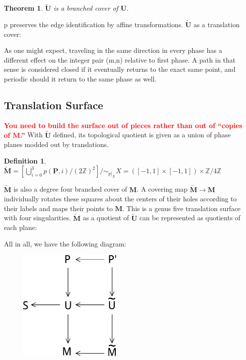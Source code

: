 \documentclass[]{article}
\newtheorem{thm}{Theorem}[subsection]
\newtheorem{Def}{Definition}[subsection]
\newcommand{\compat}[1]{\textbf{\textcolor{red}{#1}}}
\begin{document}
\begin{thm}{$\tilde{\mathbf{U}}$ is a branched cover of $\mathbf{U}$. }\newline

\end{thm}

p preserves the edge identification by affine transformations.  $\tilde{\mathbf{U}}$ as a translation cover:

\begin{figure}[H]
\centering

\end{figure}
As one might expect, traveling in the same direction in every phase has a different effect on the integer pair (m,n) relative to first phase. A path in that sense is considered closed if it eventually returns to the exact same point, and periodic should it return to the same phase as well.

\newpage
\subsection{Translation Surface}
\compat{You need to build the surface out of pieces rather than out of ``copies of $\mathbf{M}$.''} 
With $\tilde{\mathbf{U}}$ defined, its topological quotient is given as a union of phase planes modded out by translations.



\begin{Def}
$\tilde{\mathbf{M}}{}={}\left[\bigcup_{i=0}^{3} p(\mathbf{P},i)\slash(2\mathbb{Z})^{2} \right]/\sim_{p\vert_{X}}{}X{}={}(\left[-1,1\right]\times\left[-1,1\right])\times\mathbb{Z}\slash4\mathbb{Z}$
\end{Def}

$\tilde{\mathbf{M}}$ is also a degree four branched cover of $\mathbf{M}$. A covering map $\tilde{\mathbf{M}} \rightarrow \mathbf{M}$ individually rotates these squares about the centers of their holes according to their labels and maps their points to $\mathbf{M}$. This is a genus five translation surface with four singularities. $\tilde{\mathbf{M}}$ as a quotient of $\tilde{\mathbf{U}}$ can be represented as quotients of each plane:

\begin{figure}[H]
\centering

\end{figure}

All in all, we have the following diagram:

\begin{figure}[H]
\centering
\includegraphics[width=2in]{commute.pdf}
\end{figure}
\end{document}
